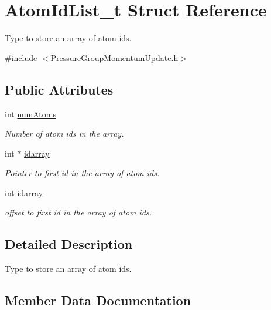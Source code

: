 \hypertarget{structAtomIdList__t}{}\section{Atom\+Id\+List\+\_\+t Struct Reference}
\label{structAtomIdList__t}


Type to store an array of atom ids.  




{\ttfamily \#include $<$Pressure\+Group\+Momentum\+Update.\+h$>$}

\subsection*{Public Attributes}
\begin{DoxyCompactItemize}
\item 
int \hyperlink{structAtomIdList__t_a0ce8ab02ed9ac3ba0cd301296b7fe437}{num\+Atoms}
\begin{DoxyCompactList}\small\item\em Number of atom ids in the array. \end{DoxyCompactList}\item 
int $\ast$ \hyperlink{structAtomIdList__t_aed052d4a7583c91ab69a6c72876f2ca0}{idarray}
\begin{DoxyCompactList}\small\item\em Pointer to first id in the array of atom ids. \end{DoxyCompactList}\item 
int \hyperlink{structAtomIdList__t_a37644f799e8425ed739a0be21823ae6f}{idarray}
\begin{DoxyCompactList}\small\item\em offset to first id in the array of atom ids. \end{DoxyCompactList}\end{DoxyCompactItemize}


\subsection{Detailed Description}
Type to store an array of atom ids. 

\subsection{Member Data Documentation}
\hypertarget{structAtomIdList__t_a37644f799e8425ed739a0be21823ae6f}{}\label{structAtomIdList__t_a37644f799e8425ed739a0be21823ae6f} 
